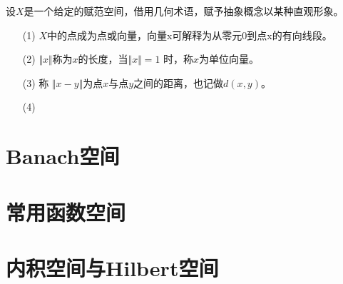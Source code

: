 设$ X $是一个给定的赋范空间，借用几何术语，赋予抽象概念以某种直观形象。
\begin{enumerate}
	\item [(1)] $ X $中的点成为点或向量，向量x可解释为从零元0到点x的有向线段。
	\item [(2)] $ \Vert x\Vert $称为$ x $的长度，当$\Vert x\Vert =1$ 时，称$ x $为单位向量。
	\item [(3)] 称 $ \Vert x-y\Vert $为点$ x $与点$ y $之间的距离，也记做$ d(x,y) $。
	\item [(4)] 
\end{enumerate}

\section{Banach空间}

\section{常用函数空间}

\section{内积空间与Hilbert空间}
